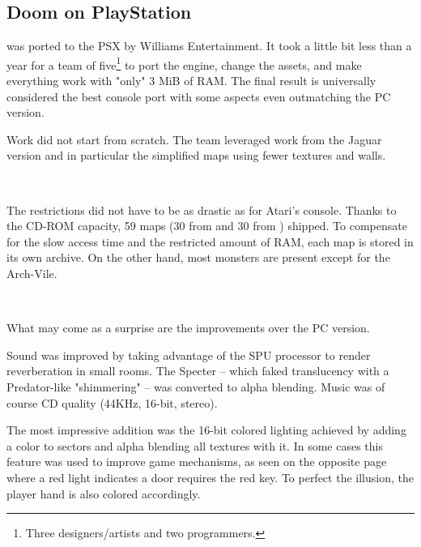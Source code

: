 \subsection{Doom on PlayStation}
\doom{} was ported to the PSX by Williams Entertainment. It took a little bit less than a year for a team of five\footnote{Three designers/artists and two programmers.} to port the engine, change the assets, and make everything work with "only" 3 MiB of RAM. The final result is universally considered the best console port with some aspects even outmatching the PC version.\\
\par
Work did not start from scratch. The team leveraged work from the Jaguar version and in particular the simplified maps using fewer textures and walls.\\
\par
{}\\
\par
  The restrictions did not have to be as drastic as for Atari's console. Thanks to the CD-ROM capacity, 59 maps (30 from \doom{} and 30 from \doomii{}) shipped. To compensate for the slow access time and the restricted amount of RAM, each map is stored in its own  archive. On the other hand, most monsters are present except for the Arch-Vile.\\
\par
{}\\
\par
What may come as a surprise are the improvements over the PC version.\\
\par
Sound was improved by taking advantage of the SPU processor to render reverberation in small rooms. The Specter -- which faked translucency with a Predator-like "shimmering" -- was converted to alpha blending. Music was of course CD quality (44KHz, 16-bit, stereo).\\
\par
 The most impressive addition was the 16-bit colored lighting achieved by adding a color to sectors and alpha blending all textures with it. In some cases this feature was used to improve game mechanisms, as seen on the opposite page where a red light indicates a door requires the red key. To perfect the illusion, the player hand is also colored accordingly.\\
\par


